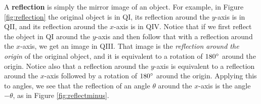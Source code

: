 \begin{center}\statecomment[0.6\textwidth]{\begin{equation}\label{eqn:sinpm180}
 \sin\;(\theta \pm 180\Degrees) ~ = ~ -\sin\;\theta
\end{equation}
\begin{equation}\label{eqn:cospm180}
 \cos\;(\theta \pm 180\Degrees) ~ = ~ -\cos\;\theta
\end{equation}
\begin{equation}\label{eqn:tanpm180}
 \tan\;(\theta \pm 180\Degrees) ~ = ~ \tan\;\theta\phantom{-}
\end{equation}}\end{center}

\piccaption[]{\label{fig:reflection}}
A \textbf{reflection} is simply the mirror image of an object.
For example, in
Figure \ref{fig:reflection} the original object is in QI, its reflection around the $y$-axis is in
QII, and its reflection around the $x$-axis is in QIV. Notice that if we first reflect the object
in QI around the $y$-axis and then follow that with a reflection around the $x$-axis, we get an
image in QIII. That image is the \emph{reflection around the origin} of the original object, and
it is equivalent to a rotation of $180^\circ$ around the origin. Notice also that a reflection
around the $y$-axis is equivalent to a reflection around the $x$-axis followed by a rotation of
$180^\circ$ around the origin.
\newpage
Applying this to angles, we see that the reflection of an angle $\theta$ around the $x$-axis is the
angle $-\theta$, as in Figure \ref{fig:reflectminus}.


